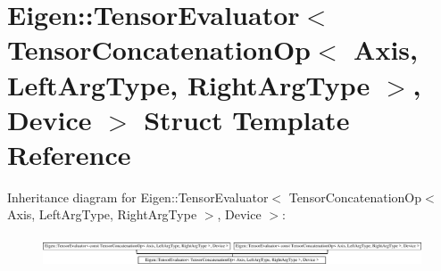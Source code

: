 \hypertarget{struct_eigen_1_1_tensor_evaluator_3_01_tensor_concatenation_op_3_01_axis_00_01_left_arg_type_00_7f27325ca3102a6730769e76427d2ca7}{}\section{Eigen\+:\+:Tensor\+Evaluator$<$ Tensor\+Concatenation\+Op$<$ Axis, Left\+Arg\+Type, Right\+Arg\+Type $>$, Device $>$ Struct Template Reference}
\label{struct_eigen_1_1_tensor_evaluator_3_01_tensor_concatenation_op_3_01_axis_00_01_left_arg_type_00_7f27325ca3102a6730769e76427d2ca7}
Inheritance diagram for Eigen\+:\+:Tensor\+Evaluator$<$ Tensor\+Concatenation\+Op$<$ Axis, Left\+Arg\+Type, Right\+Arg\+Type $>$, Device $>$\+:\begin{figure}[H]
\begin{center}
\leavevmode
\includegraphics[height=0.919540cm]{struct_eigen_1_1_tensor_evaluator_3_01_tensor_concatenation_op_3_01_axis_00_01_left_arg_type_00_7f27325ca3102a6730769e76427d2ca7}
\end{center}
\end{figure}
